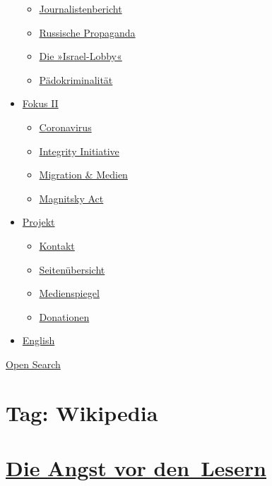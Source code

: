 \begin{itemize}
  \begin{itemize}
  \tightlist
  \item
    \href{https://swprs.org/bericht-eines-journalisten/}{Journalistenbericht}
  \item
    \href{https://swprs.org/russische-propaganda/}{Russische Propaganda}
  \item
    \href{https://swprs.org/die-israel-lobby-fakten-und-mythen/}{Die
    »Israel-Lobby«}
  \item
    \href{https://swprs.org/geopolitik-und-paedokriminalitaet/}{Pädokriminalität}
  \end{itemize}
\item
  \href{https://swprs.org/migration-und-medien/}{Fokus II}

  \begin{itemize}
  \tightlist
  \item
    \href{https://swprs.org/covid-19-hinweis-ii/}{Coronavirus}
  \item
    \href{https://swprs.org/die-integrity-initiative/}{Integrity
    Initiative}
  \item
    \href{https://swprs.org/migration-und-medien/}{Migration \& Medien}
  \item
    \href{https://swprs.org/der-fall-magnitsky/}{Magnitsky Act}
  \end{itemize}
\item
  \href{https://swprs.org/kontakt/}{Projekt}

  \begin{itemize}
  \tightlist
  \item
    \href{https://swprs.org/kontakt/}{Kontakt}
  \item
    \href{https://swprs.org/uebersicht/}{Seitenübersicht}
  \item
    \href{https://swprs.org/medienspiegel/}{Medienspiegel}
  \item
    \href{https://swprs.org/donationen/}{Donationen}
  \end{itemize}
\item
  \href{https://swprs.org/contact/}{English}
\end{itemize}

\protect\hyperlink{}{Open Search}

\hypertarget{tag-wikipedia}{%
\section{Tag: Wikipedia}\label{tag-wikipedia}}

\hypertarget{die-angst-vor-den-lesern}{%
\section{\texorpdfstring{\href{https://swprs.org/2017/03/01/leserkommentare/}{Die
Angst vor
den~Lesern}}{Die Angst vor den~Lesern}}\label{die-angst-vor-den-lesern}}

